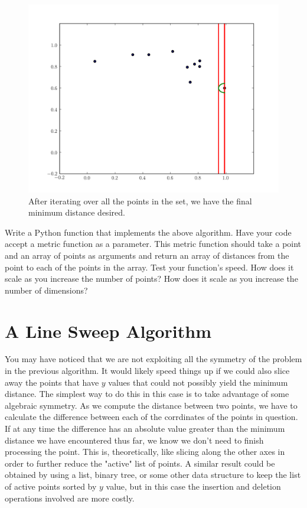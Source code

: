 \begin{figure}[H]
\includegraphics[width = \textwidth]{simple7.pdf}
\caption{After iterating over all the points in the set, we have the final minimum distance desired.}
\end{figure}

\begin{problem}
Write a Python function that implements the above algorithm.
Have your code accept a metric function as a parameter.
This metric function should take a point and an array of points as arguments and return an array of distances from the point to each of the points in the array. 
Test your function's speed. 
How does it scale as you increase the number of points? 
How does it scale as you increase the number of dimensions?
\end{problem}

\section*{A Line Sweep Algorithm}

You may have noticed that we are not exploiting all the symmetry of the problem in the previous algorithm. 
It would likely speed things up if we could also slice away the points that have $y$ values that could not possibly yield the minimum distance. 
The simplest way to do this in this case is to take advantage of some algebraic symmetry.
As we compute the distance between two points, we have to calculate the difference between each of the corrdinates of the points in question. 
If at any time the difference has an absolute value greater than the minimum distance we have encountered thus far, we know we don't need to finish processing the point.
This is, theoretically, like slicing along the other axes in order to further reduce the "active" list of points.
A similar result could be obtained by using a list, binary tree, or some other data structure to keep the list of active points sorted by $y$ value, but in this case the insertion and deletion operations involved are more costly.

